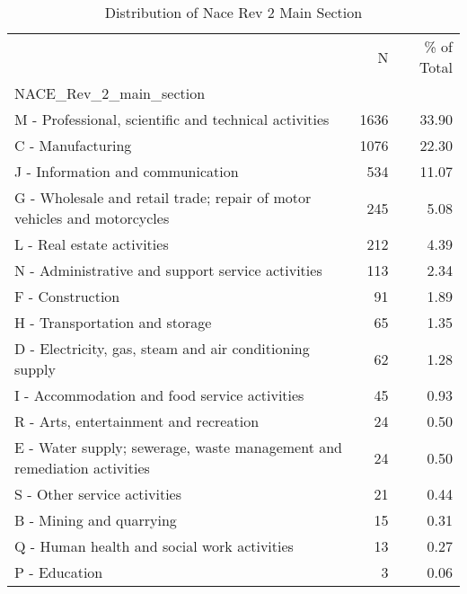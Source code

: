 \begin{table*}[htbp]
\centering
\small
\caption{Distribution of Nace Rev 2 Main Section}
\label{tab:dist_nace_rev_2_main_section}
\begin{tabular}{lrr}
\toprule
 & N & \% of Total \\
NACE_Rev_2_main_section &  &  \\
\midrule
M - Professional, scientific and technical activities & 1636 & 33.90 \\
C - Manufacturing & 1076 & 22.30 \\
J - Information and communication & 534 & 11.07 \\
G - Wholesale and retail trade; repair of motor vehicles and motorcycles & 245 & 5.08 \\
L - Real estate activities & 212 & 4.39 \\
N - Administrative and support service activities & 113 & 2.34 \\
F - Construction & 91 & 1.89 \\
H - Transportation and storage & 65 & 1.35 \\
D - Electricity, gas, steam and air conditioning supply & 62 & 1.28 \\
I - Accommodation and food service activities & 45 & 0.93 \\
R - Arts, entertainment and recreation & 24 & 0.50 \\
E - Water supply; sewerage, waste management and remediation activities & 24 & 0.50 \\
S - Other service activities & 21 & 0.44 \\
B - Mining and quarrying & 15 & 0.31 \\
Q - Human health and social work activities & 13 & 0.27 \\
P - Education & 3 & 0.06 \\
\bottomrule
\end{tabular}
\end{table*}
